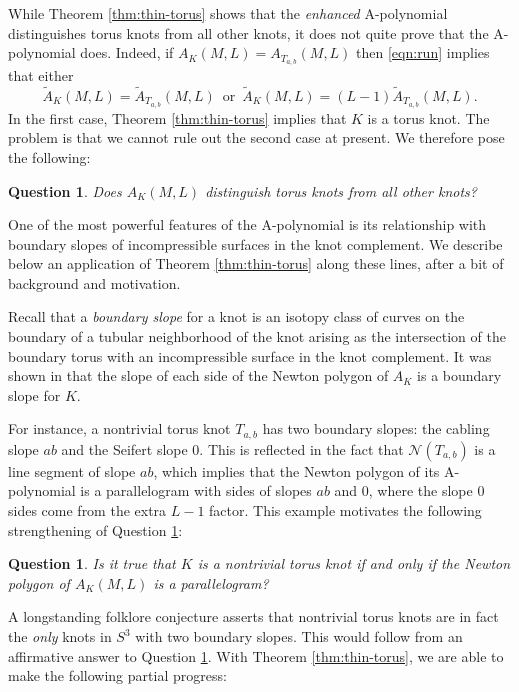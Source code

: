 \documentclass[11pt]{amsart}
\newtheorem {question}[theorem]{Question}
\numberwithin{equation}{section}
\numberwithin{theorem}{section}
\theoremstyle{definition}
\newcommand{\cN}{\mathcal{N}}
\begin{document}
While Theorem \ref{thm:thin-torus} shows that the \emph{enhanced} A-polynomial distinguishes torus knots from all other knots, it does not quite prove that the  A-polynomial does. Indeed, if $A_{K}(M,L) = A_{T_{a,b}}(M,L)$ then \eqref{eqn:run} implies that either 
\[\tilde{A}_K(M,L) = \tilde{A}_{T_{a,b}}(M,L) \,\textrm{ or }\, \tilde{A}_K(M,L) = (L-1)\tilde{A}_{T_{a,b}}(M,L).\]
In the first case, Theorem \ref{thm:thin-torus} implies that $K$ is a torus knot. The  problem is that  we cannot rule out the second case at present. We therefore pose the following:

\begin{question}
\label{ques:unreduced}
Does $A_{K}(M,L)$ distinguish torus knots from all other knots?
\end{question}

One of the most powerful features of the A-polynomial is its relationship with boundary slopes of incompressible surfaces in the knot complement. We describe below an application of Theorem \ref{thm:thin-torus} along these lines, after a bit of background and motivation.

Recall that a \emph{boundary slope} for a knot is an isotopy class of curves  on the boundary of a tubular neighborhood of the knot arising as the intersection of the boundary torus with an incompressible surface in the knot complement. It was shown in \cite{ccgls} that the slope of each side of the Newton polygon of $A_K$ is a boundary slope for $K$.

For instance, a nontrivial torus knot $T_{a,b}$ has two boundary slopes: the cabling slope $ab$ and the Seifert slope 0. This is reflected in the fact that $\cN(T_{a,b})$ is a line segment of slope $ab$, which implies that the Newton polygon of its A-polynomial is a parallelogram  with sides of slopes $ab$ and $0$, where the slope $0$ sides come from the  extra  $L-1$ factor. This example motivates the following strengthening of Question \ref{ques:unreduced}:

\begin{question}
\label{ques:parallelogram} Is it true that $K$ is a nontrivial torus knot if and only if the Newton polygon of $A_K(M,L)$ is a parallelogram?
\end{question}

A longstanding folklore conjecture asserts that nontrivial torus knots are in fact the \emph{only} knots in $S^3$ with two boundary slopes. This would follow from an affirmative answer to Question \ref{ques:parallelogram}.
With Theorem \ref{thm:thin-torus}, we are able to make the following partial progress:
\end{document}
